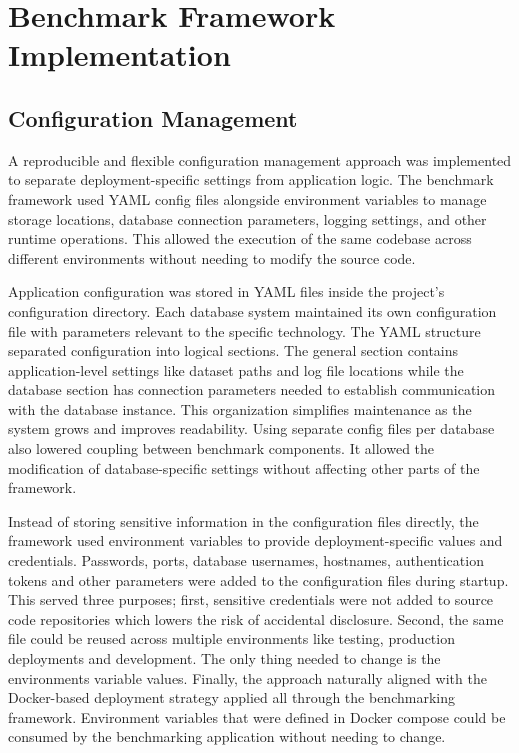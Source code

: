 \section{Benchmark Framework Implementation}
\subsection{Configuration Management }
A reproducible and flexible configuration management approach was implemented to separate deployment-specific settings from application logic. The benchmark framework used YAML config files alongside environment variables to manage storage locations, database connection parameters, logging settings, and other runtime operations. This allowed the execution of the same codebase across different environments without needing to modify the source code. 

Application configuration was stored in YAML files inside the project’s configuration directory. Each database system maintained its own configuration file with parameters relevant to the specific technology. The YAML structure separated configuration into logical sections. The general section contains application-level settings like dataset paths and log file locations while the database section has connection parameters needed to establish communication with the database instance. This organization simplifies maintenance as the system grows and improves readability. Using separate config files per database also lowered coupling between benchmark components. It allowed the modification of database-specific settings without affecting other parts of the framework. 


Instead of storing sensitive information in the configuration files directly, the framework used environment variables to provide deployment-specific values and credentials. Passwords, ports, database usernames, hostnames, authentication tokens and other parameters were added to the configuration files during startup. This served three purposes; first, sensitive credentials were not added to source code repositories which lowers the risk of accidental disclosure. Second, the same file could be reused across multiple environments like testing, production deployments and development. The only thing needed to change is the environments variable values. Finally, the approach naturally aligned with the Docker-based deployment strategy applied all through the benchmarking framework. Environment variables that were defined in Docker compose could be consumed by the benchmarking application without needing to change. 


